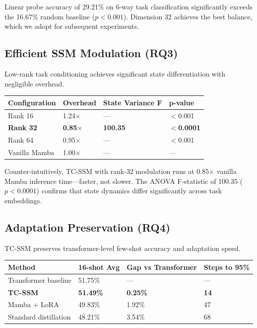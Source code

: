 Linear probe accuracy of 29.21\% on 6-way task classification significantly exceeds the 16.67\% random baseline ($p<0.001$). Dimension 32 achieves the best balance, which we adopt for subsequent experiments.

\subsection{Efficient SSM Modulation (RQ3)}

Low-rank task conditioning achieves significant state differentiation with negligible overhead.

\begin{table}[h]
\centering
\begin{tabular}{@{}llll@{}}
\toprule
Configuration & Overhead & State Variance F & p-value \\
\midrule
Rank 16 & 1.24$\times$ & --- & $<$0.001 \\
\textbf{Rank 32} & \textbf{0.85$\times$} & \textbf{100.35} & \textbf{$<$0.0001} \\
Rank 64 & 0.95$\times$ & --- & $<$0.001 \\
Vanilla Mamba & 1.00$\times$ & --- & --- \\
\bottomrule
\end{tabular}
\end{table}

Counter-intuitively, TC-SSM with rank-32 modulation runs at 0.85$\times$ vanilla Mamba inference time---faster, not slower. The ANOVA F-statistic of 100.35 ($p<0.0001$) confirms that state dynamics differ significantly across task embeddings.

\subsection{Adaptation Preservation (RQ4)}

TC-SSM preserves transformer-level few-shot accuracy and adaptation speed.

\begin{table}[h]
\centering
\begin{tabular}{@{}llll@{}}
\toprule
Method & 16-shot Avg & Gap vs Transformer & Steps to 95\% \\
\midrule
Transformer baseline & 51.75\% & --- & --- \\
\textbf{TC-SSM} & \textbf{51.49\%} & \textbf{0.25\%} & \textbf{14} \\
Mamba + LoRA & 49.83\% & 1.92\% & 47 \\
Standard distillation & 48.21\% & 3.54\% & 68 \\
\bottomrule
\end{tabular}
\end{table}

